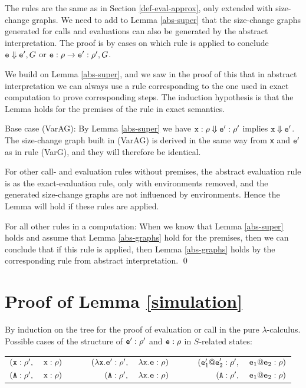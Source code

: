 \documentclass{LMCS}
\newcommand{\bt}{\begin{tabular}}
\newcommand{\et}{\end{tabular}}
\newcommand{\bprf}{\proof}
\newcommand{\eprf}{\qed}
\theoremstyle{definition}\newtheorem{env}[thm]{Environment}
\begin{document}
\bprf 
The rules are the same as in Section \ref{def-eval-approx}, 
only extended with size-change graphs. 
We need to add to Lemma \ref{abs-super} that the size-change graphs 
generated for
calls and evaluations can also be generated by the abstract interpretation. 
The proof is by cases on which rule is applied to conclude 
${\tt e}\Downarrow{\tt e}',G$ or ${\tt e}:\rho\to{\tt e}':\rho',G$. 

We build on Lemma \ref{abs-super}, and we saw in the proof of this that 
in abstract interpretation we can always use a rule corresponding to 
the one used in exact computation to prove corresponding steps. 
The induction hypothesis is that the Lemma holds for the premises of the rule 
in exact semantics. 

Base case (VarAG): By Lemma \ref{abs-super} 
we have ${\tt x}:\rho \Downarrow {\tt e}':\rho'$ implies 
${\tt x} \Downarrow {\tt e}'$. The size-change graph built in (VarAG) 
is derived in the same way from {\tt x} and ${\tt e}'$ 
as in rule (VarG), and they will therefore be identical.

For other call- and evaluation rules without premises, 
the abstract evaluation rule 
is as the exact-evaluation rule, only with environments removed, and 
the generated size-change graphs 
are not influenced by environments. Hence the Lemma will hold if these rules are applied.

For all other rules in a computation: When we know that 
Lemma \ref{abs-super} holds and 
assume that Lemma \ref{abs-graphs} hold for the premises, then we 
can conclude that 
if this rule is applied, then Lemma \ref{abs-graphs} holds by the 
corresponding rule from 
abstract interpretation. 
\eprf
\section{Proof of Lemma \ref{simulation}}
\bprf By induction on the tree for the proof of evaluation or call in the pure $\lambda$-calculus.\\
Possible cases of the structure of ${\tt e}':\rho'$ and ${\tt e}:\rho$ in $S$-related states:\smallskip

\bt{rlccrlccrl}
$({\tt x}:\rho',$&${\tt x}:\rho)$& & &
$(\lambda {\tt x.e}':\rho',$&$\lambda {\tt x.e}:\rho)$& & &
$({\tt e}_1'{\tt @e}_2':\rho',$&${\tt e}_1{\tt @e}_2:\rho)$\\
$({\tt A}:\rho',$&${\tt x}:\rho)$& & &
$({\tt A}:\rho',$&$\lambda {\tt x.e}:\rho)$& & &
$({\tt A}:\rho',$&${\tt e}_1{\tt @e}_2:\rho)$\\
\et
\medskip
\end{document}

